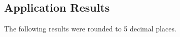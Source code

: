 

\subsection{Application Results}\label{Tables_appl}
The following results were rounded to 5 decimal places.

	
	
	


